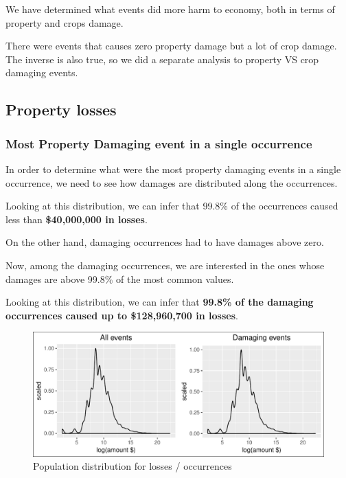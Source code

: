 \documentclass[]{article}
\begin{document}
We have determined what events did more harm to economy, both in terms
of property and crops damage.

There were events that causes zero property damage but a lot of crop
damage. The inverse is also true, so we did a separate analysis to
property VS crop damaging events.

\subsection{Property losses}\label{property-losses}

\subsubsection{Most Property Damaging event in a single
occurrence}\label{most-property-damaging-event-in-a-single-occurrence}

In order to determine what were the most property damaging events in a
single occurrence, we need to see how damages are distributed along the
occurrences.

Looking at this distribution, we can infer that 99.8\% of the
occurrences caused less than \textbf{\$40,000,000 in losses}.

On the other hand, damaging occurrences had to have damages above zero.

Now, among the damaging occurrences, we are interested in the ones whose
damages are above 99.8\% of the most common values.

Looking at this distribution, we can infer that \textbf{99.8\% of the
damaging occurrences caused up to \$128,960,700 in losses}.

\begin{figure}[htbp]
\centering
\includegraphics{readme_files/figure-latex/crop-distribution-1.pdf}
\caption{Population distribution for losses / occurrences}
\end{figure}
\end{document}
